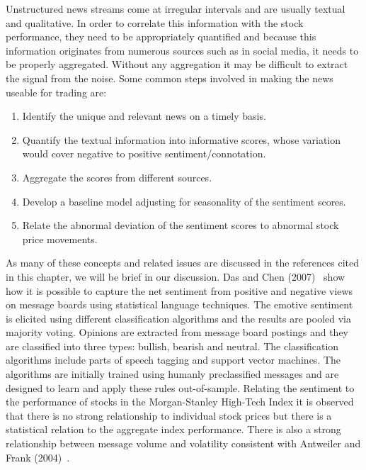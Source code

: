 Unstructured news streams come at irregular intervals and are usually textual and qualitative. In order to correlate this information with the stock performance, they need to be appropriately quantified and because this information originates from numerous sources such as in social media, it needs to be properly aggregated. Without any aggregation it may be difficult to extract the signal from the noise. Some common steps involved in making the news useable for trading are:
	\begin{enumerate}[--]
	\item Identify the unique and relevant news on a timely basis.
	\item Quantify the textual information into informative scores, whose variation would cover negative to positive sentiment/connotation.
	\item Aggregate the scores from different sources.
	\item Develop a baseline model adjusting for seasonality of the sentiment scores.
	\item Relate the abnormal deviation of the sentiment scores to abnormal stock price movements. 
	\end{enumerate}
As many of these concepts and related issues are discussed in the references cited in this chapter, we will be brief in our discussion. Das and Chen (2007)~\cite{daschen} show how it is possible to capture the net sentiment from positive and negative views on message boards using statistical language techniques. The emotive sentiment is elicited using different classification algorithms and the results are pooled via majority voting. Opinions are extracted from message board postings and they are classified into three types: bullish, bearish and neutral. The classification algorithms include parts of speech tagging and support vector machines. The algorithms are initially trained using humanly preclassified messages and are designed to learn and apply these rules out-of-sample. Relating the sentiment to the performance of stocks in the Morgan-Stanley High-Tech Index it is observed that there is no strong relationship to individual stock prices but there is a statistical relation to the aggregate index performance. There is also a strong relationship between message volume and volatility consistent with Antweiler and Frank (2004)~\cite{antweiler2004all}.  


